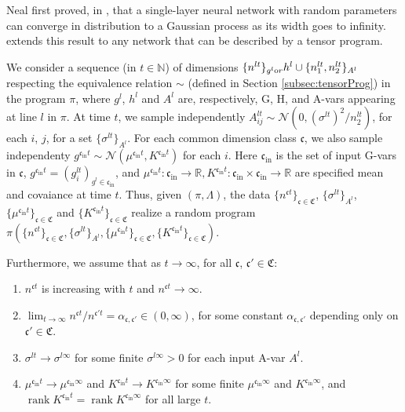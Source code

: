\documentclass[11pt,notitlepage]{article}
\numberwithin{equation}{section}
\def\R{{\mathbb{R}}}
\def\normdist{\mathcal{N}}
\DeclareMathOperator{\rank}{rank}
\theoremstyle{remark}
\theoremstyle{definition}
\begin{document}
	Neal first proved, in \cite{neal2012bayesian}, that a single-layer neural network with random parameters can converge in distribution to a Gaussian process as its width goes to infinity. \cite{yang2019scaling} extends this result to any network that can be described by a tensor program.
	
	We consider a sequence (in $t \in \mathbb{N}$) of dimensions $\{n^{lt}\}_{g^l\text or }h^l \cup \{n_1^{lt}, n_2^{lt}\}_{A^l}$ respecting the equivalence relation $\sim$ (defined in Section \ref{subsec:tensorProg}) in the program $\pi$, where $g^l$, $h^l$ and $A^l$ are, respectively, G, H, and A-vars appearing at line $l$ in $\pi$.
	At time $t$, we sample independently $A^{lt}_{ij} \sim \normdist(0, (\sigma^{lt})^2/n_2^{lt})$, for each $i$, $j$, for a set $\{\sigma^{lt} \}_{A^l}$.
	For each common dimension class $\mathfrak{c}$, we also sample independenty $g^{\mathfrak{c}_{\text{in}}t} \sim \normdist(\mu^{\mathfrak{c}_{\text{in}}t}, K^{\mathfrak{c}_{\text{in}}t})$ for each $i$.
	Here $\mathfrak{c}_{\text{in}}$ is the set of input G-vars in $\mathfrak{c}$, $g^{\mathfrak{c}_{\text{in}}t} = (g^{lt}_i)_{g^l \in \mathfrak{c}_{\text{in}}}$, and $\mu^{\mathfrak{c}_{\text{in}}t}: \mathfrak{c}_{\text{in}} \rightarrow \R, K^{\mathfrak{c}_{\text{in}}t}: \mathfrak{c}_{\text{in}} \times \mathfrak{c}_{\text{in}} \rightarrow \R$ are specified mean and covaiance at time $t$.
	Thus, given $(\pi, \Lambda)$, the data $\{n^{\mathfrak{c}t}\}_{\mathfrak{c} \in \mathfrak{C}}$, $\{\sigma^{lt}\}_{A^l}$, $\{\mu^{\mathfrak{c}_{\text{in}}t}\}_{\mathfrak{c} \in \mathfrak{C}}$ and $\{K^{\mathfrak{c}_{\text{in}}t}\}_{\mathfrak{c} \in \mathfrak{C}}$ realize a random program $\pi(\{n^{\mathfrak{c}t}\}_{\mathfrak{c} \in \mathfrak{C}}, \{\sigma^{lt}\}_{A^l}, \{\mu^{\mathfrak{c}_{\text{in}}t}\}_{\mathfrak{c} \in \mathfrak{C}}, \{K^{\mathfrak{c}_{\text{in}}t}\}_{\mathfrak{c} \in \mathfrak{C}})$.
	
	Furthermore, we assume that as $t \rightarrow \infty$, for all $\mathfrak{c}$, $\mathfrak{c}' \in \mathfrak{C}$:
	\begin{enumerate}[itemsep=0em, topsep=3pt]
		\item $n^{\mathfrak{c}t}$ is increasing with $t$ and $n^{\mathfrak{c}t} \rightarrow \infty$.
		\item $\lim_{t \rightarrow \infty} n^{\mathfrak{c}t} / n^{\mathfrak{c}'t} = \alpha_{\mathfrak{c}, \mathfrak{c}'} \in (0, \infty)$, for some constant $\alpha_{\mathfrak{c}, \mathfrak{c}'}$ depending only on $\mathfrak{c}' \in \mathfrak{C}$.
		\item $\sigma^{lt} \rightarrow \sigma^{l\infty}$ for some finite $\sigma^{l\infty} > 0$ for each input A-var $A^l$.
		\item $\mu^{\mathfrak{c}_{\text{in}}t} \rightarrow \mu^{\mathfrak{c}_{\text{in}}\infty}$ and $K^{\mathfrak{c}_{\text{in}}t} \rightarrow K^{\mathfrak{c}_{\text{in}}\infty}$ for some finite $\mu^{\mathfrak{c}_{\text{in}}\infty}$ and $K^{\mathfrak{c}_{\text{in}}\infty}$, and $\rank K^{\mathfrak{c}_{\text{in}}t} = \rank K^{\mathfrak{c}_{\text{in}}\infty}$ for all large $t$.
	\end{enumerate}
	
\end{document}
